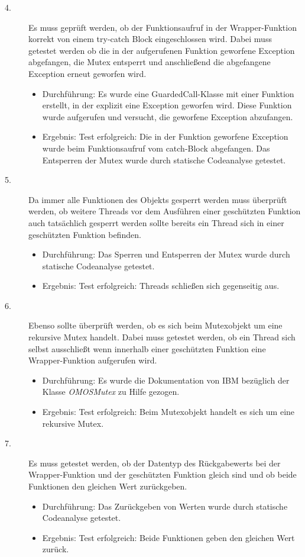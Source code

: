 \begin{description}
	\item[4.]
	Es muss geprüft werden, ob der Funktionsaufruf in der Wrapper-Funktion korrekt von einem try-catch Block eingeschlossen wird. Dabei muss getestet werden ob die in der aufgerufenen Funktion geworfene Exception abgefangen, die Mutex entsperrt und anschließend die abgefangene Exception erneut geworfen wird.
	\begin{itemize}
  		\item{Durchführung:}
			Es wurde eine GuardedCall-Klasse mit einer Funktion erstellt, in der explizit eine Exception geworfen wird. Diese Funktion wurde aufgerufen und versucht, die geworfene Exception abzufangen.
  		\item{Ergebnis:}
			Test erfolgreich: Die in der Funktion geworfene Exception wurde beim Funktionsaufruf vom catch-Block abgefangen. 	Das Entsperren der Mutex wurde durch statische Codeanalyse getestet.
  	\end{itemize}
	
	\item[5.]
	Da immer alle Funktionen des Objekts gesperrt werden muss überprüft werden, ob weitere Threads vor dem Ausführen einer geschützten Funktion auch tatsächlich gesperrt werden sollte bereits ein Thread sich in einer geschützten Funktion befinden.
	\begin{itemize}
  		\item{Durchführung:}
			Das Sperren und Entsperren der Mutex wurde durch statische Codeanalyse getestet.
  		\item{Ergebnis:}
			Test erfolgreich: Threads schließen sich gegenseitig aus.
  	\end{itemize}
	
	\item[6.]
	Ebenso sollte überprüft werden, ob es sich beim Mutexobjekt um eine rekursive Mutex handelt. Dabei muss getestet werden, ob ein Thread sich selbst ausschließt wenn innerhalb einer geschützten Funktion eine Wrapper-Funktion aufgerufen wird.
	\begin{itemize}
  		\item{Durchführung:}
			Es wurde die Dokumentation von IBM bezüglich der Klasse \textit{OMOSMutex} zu Hilfe gezogen.
  		\item{Ergebnis:}
			Test erfolgreich: Beim Mutexobjekt handelt es sich um eine rekursive Mutex.
  	\end{itemize}
	
	\item[7.]
	Es muss getestet werden, ob der Datentyp des Rückgabewerts bei der Wrapper-Funktion und der geschützten Funktion gleich sind und ob beide Funktionen den gleichen Wert zurückgeben.
	\begin{itemize}
  		\item{Durchführung:}
			Das Zurückgeben von Werten wurde durch statische Codeanalyse getestet.
  		\item{Ergebnis:}
			Test erfolgreich: Beide Funktionen geben den gleichen Wert zurück.
  	\end{itemize}
	
	
\end{description}
